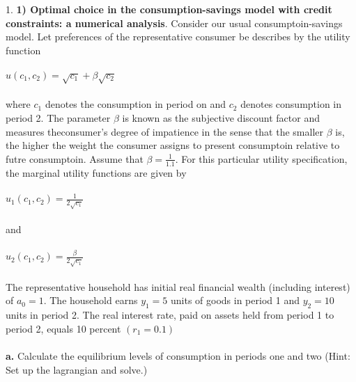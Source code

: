 \documentclass[11pt]{SelfArxOneColBMN}
\affiliation{\textsuperscript{1}\textit{John E. Walker Department of Economics,
Clemson University,Clemson, SC: email ijdavis@g.clemson.edu}}
\date{\small{Version ~\today}}
\begin{document}
\flushbottom

\maketitle

\renewcommand{\theexercise}{\arabic{exercise}}%

1. \textbf{1) Optimal choice in the consumption-savings model with credit constraints: a numerical analysis}. Consider our usual consumptoin-savings model. Let preferences of the representative consumer be describes by the utility function\\
\\
$u(c_1,c_2) = \sqrt{c_1} + \beta\sqrt{c_2}$\\
\\
where $c_1$ denotes the consumption in period on and $c_2$ denotes consumption in period 2. The parameter $\beta$ is known as the subjective discount factor and measures theconsumer's degree of impatience in the sense that the smaller $\beta$ is, the higher the weight the consumer assigns to present consumptoin relative to futre consumptoin. Assume that $\beta = \frac{1}{1.1}$. For this particular utility specification, the marginal utility functions are given by\\
\\
$u_1(c_1,c_2) = \frac{1}{2\sqrt{c_1}}$\\
\\
and\\
\\
$u_2(c_1,c_2) = \frac{\beta}{2\sqrt{c_1}}$\\
\\
The representative household has initial real financial wealth (including interest) of $a_0 = 1$. The household earns  $y_1 = 5$ units of goods in period 1 and $y_2 = 10$ units in period 2. The real interest rate, paid on assets held from period 1 to period 2, equals 10 percent $(r_1 = 0.1)$\\
\\
\indent \textbf{a.} Calculate the equilibrium levels of consumption in periods one and two (Hint: Set up the lagrangian and solve.)\\
\\
\end{document}
